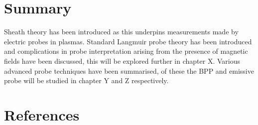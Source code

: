 

\section{Summary}
Sheath theory has been introduced as this underpins measurements made by electric probes in plasmas. Standard Langmuir probe theory has been introduced and complications in probe interpretation arising from the presence of magnetic fields have been discussed, this will be explored further in chapter X. Various advanced probe techniques have been summarised, of these the BPP and emissive probe will be studied in chapter Y and Z respectively. 

\section{References}

